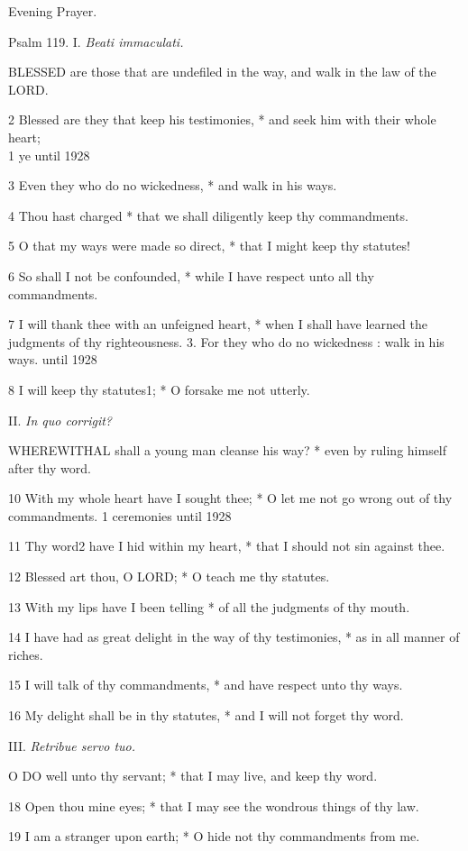 Evening
Prayer.

Psalm
119. I. \emph{Beati immaculati.}

BLESSED
are those that are undefiled in the way, and walk in the law of the LORD.

2 Blessed are they that keep his testimonies, * and
seek him with their whole heart; \\
1 ye until
1928

3 Even they who do no wickedness, * and walk in his ways.

4 Thou hast charged * that we shall diligently keep thy
commandments.

5 O that my ways were made so direct, * that I might
keep thy statutes!

6 So shall I not be confounded, * while I have respect
unto all thy commandments.

7 I will thank thee with an unfeigned heart, * when I
shall have learned the judgments of thy righteousness. 3. For they who do no wickedness
: walk in his ways. until
1928

8 I will
keep thy statutes1; * O forsake me not utterly.

II.
\emph{In quo corrigit?}

WHEREWITHAL
shall a young man cleanse his way? * even by ruling himself after thy
word.

10 With my whole heart have I sought thee; * O let
me not go wrong out of thy commandments. 1 ceremonies until
1928

11 Thy word2 have I hid within my heart, * that I should not
sin against thee.

12 Blessed art thou, O LORD; * O teach me thy statutes.

13 With my lips have I been telling * of all the judgments
of thy mouth.

14 I have had as great delight in the way of thy testimonies,
* as in all manner of riches.

15 I will talk of thy commandments, * and have respect
unto thy ways.

16 My delight shall be in thy statutes, * and I will
not forget thy word.

III.
\emph{Retribue servo tuo.}

O
DO well unto thy servant; * that I may live, and keep thy word.

18 Open thou mine eyes; * that I may see the wondrous
things of thy law.

19 I am a stranger upon earth; * O hide not thy commandments
from me.

